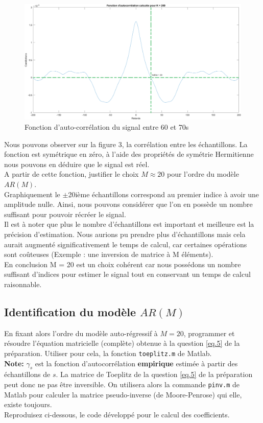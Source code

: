 \documentclass{article}
\begin{document}
\clearpage
\begin{figure}[!h]
    \centering
    \includegraphics[width=1\textwidth]{images/convo.png}
    \caption{Fonction d'auto-corrélation du signal entre 60 et 70s}
    \label{fig-binaire}
\end{figure}
Nous pouvons observer sur la figure 3, la corrélation entre les échantillons. La fonction est symétrique en zéro, à l'aide des propriétés de symétrie Hermitienne nous pouvons en déduire que le signal est réel. \\
\newline
A partir de cette fonction, justifier le choix $M \approx 20$ pour l'ordre du modèle $AR(M)$.\\
\newline
Graphiquement le $\pm$20ième échantillons correspond au premier indice à avoir une amplitude nulle. Ainsi, nous pouvons considérer que l'on en possède un nombre suffisant pour pouvoir récréer le signal. \\
Il est à noter que plus le nombre d'échantillons est important et meilleure est la précision d'estimation. Nous aurions pu prendre plus d'échantillons mais cela aurait augmenté significativement le temps de calcul, car certaines opérations sont coûteuses (Exemple : une inversion de matrice à M éléments). \\
En conclusion M = 20 est un choix cohérent car nous possédons un nombre suffisant d'indices pour estimer le signal tout en conservant un temps de calcul raisonnable. 

\newpage
\subsection{Identification du modèle $AR(M)$}

En fixant alors l'ordre du modèle auto-régressif à $M=20$, programmer et résoudre l'équation matricielle (complète) obtenue à la question  \ref{eq.5} de la préparation. Utiliser pour cela, la fonction {\tt toeplitz.m} de Matlab. \\[1mm]
\textbf{Note:} $\gamma_s$ est la fonction d'autocorrélation  \textbf{empirique} estimée à partir des échantillons de $s$. La matrice de Toeplitz de la question \ref{eq.5} de la préparation peut donc ne pas être inversible. On utilisera alors la commande {\tt pinv.m} de Matlab pour calculer la matrice pseudo-inverse (de Moore-Penrose) qui elle, existe toujours.\\[1mm]
Reproduisez ci-dessous, le code développé pour le calcul des coefficients.
 
\end{document}
